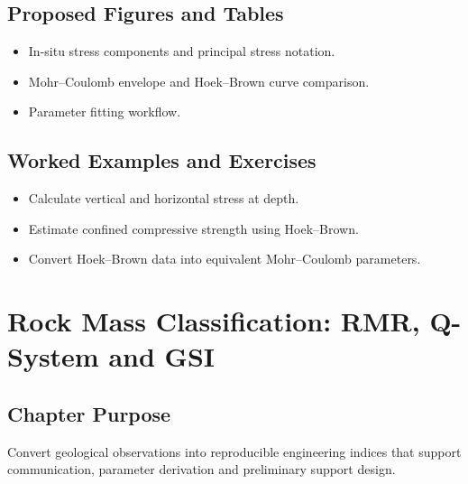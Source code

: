 \documentclass[12pt,oneside]{book}
\begin{document}
\section{Proposed Figures and Tables}
\begin{itemize}
    \item In-situ stress components and principal stress notation.
    \item Mohr--Coulomb envelope and Hoek--Brown curve comparison.
    \item Parameter fitting workflow.
\end{itemize}

\section{Worked Examples and Exercises}
\begin{itemize}
    \item Calculate vertical and horizontal stress at depth.
    \item Estimate confined compressive strength using Hoek--Brown.
    \item Convert Hoek--Brown data into equivalent Mohr--Coulomb parameters.
\end{itemize}

\chapter{Rock Mass Classification: RMR, Q-System and GSI}

\section{Chapter Purpose}
Convert geological observations into reproducible engineering indices that support communication, parameter derivation and preliminary support design.
\end{document}
